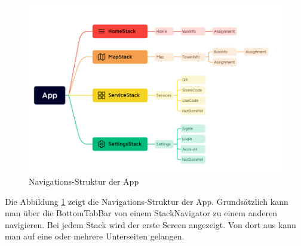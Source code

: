 \begin{figure}[H]
    \centering
    \includegraphics[width=1\textwidth]{images/appnavigation.png}
    \caption{Navigations-Struktur der App}
    \label{fig:appnavigation}
\end{figure}

Die Abbildung \ref{fig:appnavigation} zeigt die Navigations-Struktur der App. Grundsätzlich kann man über die BottomTabBar von einem StackNavigator zu einem anderen navigieren. Bei jedem Stack wird der erste Screen angezeigt. Von dort aus kann man auf eine oder mehrere Unterseiten gelangen.